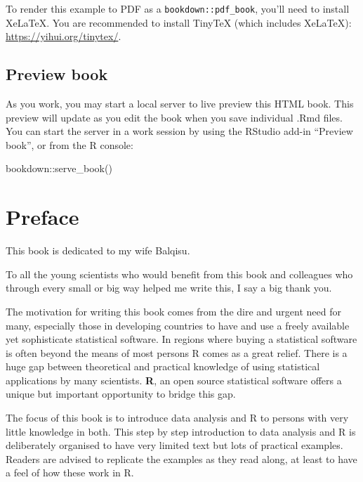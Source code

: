 \documentclass[
]{book}
\newenvironment{Shaded}{\begin{snugshade}}{\end{snugshade}}
\newcommand{\FunctionTok}[1]{\textcolor[rgb]{0.00,0.00,0.00}{#1}}
\newcommand{\NormalTok}[1]{#1}
\newcommand{\SpecialCharTok}[1]{\textcolor[rgb]{0.00,0.00,0.00}{#1}}
\theoremstyle{definition}
\theoremstyle{definition}
\theoremstyle{definition}
\theoremstyle{definition}
\theoremstyle{remark}
\begin{document}
To render this example to PDF as a \texttt{bookdown::pdf\_book}, you'll need to install XeLaTeX. You are recommended to install TinyTeX (which includes XeLaTeX): \url{https://yihui.org/tinytex/}.

\hypertarget{preview-book}{%
\section{Preview book}\label{preview-book}}

As you work, you may start a local server to live preview this HTML book. This preview will update as you edit the book when you save individual .Rmd files. You can start the server in a work session by using the RStudio add-in ``Preview book'', or from the R console:

\begin{Shaded}
\begin{Highlighting}[]
\NormalTok{bookdown}\SpecialCharTok{::}\FunctionTok{serve\_book}\NormalTok{()}
\end{Highlighting}
\end{Shaded}

\hypertarget{preface}{%
\chapter{Preface}\label{preface}}

This book is dedicated to my wife Balqisu.

To all the young scientists who would benefit from this book and colleagues who
through every small or big way helped me write this, I say a big thank you.
\citet{diener1996most}

The motivation for writing this book comes from the dire and urgent need for
many, especially those in developing countries to have and use a freely
available yet sophisticate statistical software. In regions where buying a
statistical software is often beyond the means of most persons R comes as a
great relief. There is a huge gap between theoretical and practical knowledge of
using statistical applications by many scientists. \textbf{R}, an open source
statistical software offers a unique but important opportunity to bridge this
gap.

The focus of this book is to introduce data analysis and R to persons with very
little knowledge in both. This step by step introduction to data analysis and R
is deliberately organised to have very limited text but lots of practical
examples. Readers are advised to replicate the examples as they read along, at
least to have a feel of how these work in R.
\end{document}
